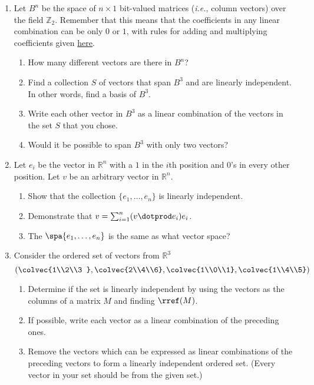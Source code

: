 


\begin{enumerate}
\item \label{bitsprob}Let $B^n$ be the space of $n\times 1$ bit-valued matrices ({\itshape i.e.}, column vectors) over the field \({\mathbb Z}_2\).
Remember that this means that the coefficients in any linear combination can be only \(0\) or \(1\), with rules for adding and multiplying coefficients given \hyperref[Z2]{here}.  
\begin{enumerate}
\item How many different vectors are there in $B^n$?
\item  Find a collection $S$ of vectors that span $B^3$ and are linearly independent.  In other words, find a basis of $B^3$.
\item Write each other vector in $B^3$ as a linear combination of the vectors in the set $S$ that you chose.
\item Would it be possible to span $B^3$ with only two vectors?
\end{enumerate}



\item \label{stdbasis} Let $e_i$ be the vector in $\mathbb{R}^n$ with a $1$ in the $i$th position and $0$'s in every other position.  Let $v$ be an arbitrary vector in $\mathbb{R}^n$.
\begin{enumerate}
\item Show that the collection $\{e_1, \ldots, e_n \}$ is linearly independent.
\item Demonstrate that $v=\sum_{i=1}^n (v\dotprod e_i)e_i$.
\item The $\spa \{e_1, \ldots, e_n \}$ is the same as what vector space?
\end{enumerate}


\item Consider the ordered set of vectors from $\mathbb{R}^3$
\[
\left( \colvec{1\\2\\3 } , \colvec{2\\4\\6}, \colvec{1\\0\\1} , \colvec{1\\4\\5} \right) 
\]
\begin{enumerate}
\item Determine if the set is linearly independent by using the vectors as the columns of a matrix $M$ and finding $\rref(M)$.
\item If possible, write each vector as a linear combination of the preceding ones.
\item Remove the vectors which can be expressed as linear combinations of the preceding vectors to form a linearly independent ordered set. (Every vector in your set should be from the given set.)
\end{enumerate}


\end{enumerate}
